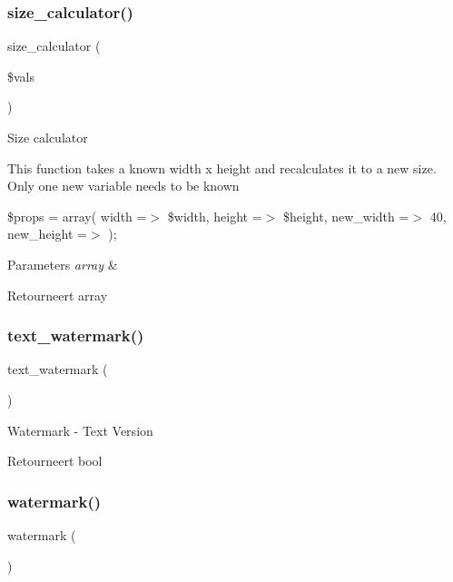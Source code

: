 \subsubsection{\texorpdfstring{size\_calculator()}{size\_calculator()}}
{\footnotesize\ttfamily size\+\_\+calculator (\begin{DoxyParamCaption}\item[{}]{\$vals }\end{DoxyParamCaption})}

Size calculator

This function takes a known width x height and recalculates it to a new size. Only one new variable needs to be known

\$props = array( \textquotesingle{}width\textquotesingle{} =$>$ \$width, \textquotesingle{}height\textquotesingle{} =$>$ \$height, \textquotesingle{}new\+\_\+width\textquotesingle{} =$>$ 40, \textquotesingle{}new\+\_\+height\textquotesingle{} =$>$ \textquotesingle{}\textquotesingle{} );


\begin{DoxyParams}{Parameters}
{\em array} & \\
\hline
\end{DoxyParams}
\begin{DoxyReturn}{Retourneert}
array 
\end{DoxyReturn}
\mbox{\label{class_c_i___image__lib_afb7640b6150e16b00efac0511d9fa03d}} 
\subsubsection{\texorpdfstring{text\_watermark()}{text\_watermark()}}
{\footnotesize\ttfamily text\+\_\+watermark (\begin{DoxyParamCaption}{ }\end{DoxyParamCaption})}

Watermark -\/ Text Version

\begin{DoxyReturn}{Retourneert}
bool 
\end{DoxyReturn}
\mbox{\label{class_c_i___image__lib_a4732a76680e7c0b28f98f6634b567cc9}} 
\subsubsection{\texorpdfstring{watermark()}{watermark()}}
{\footnotesize\ttfamily watermark (\begin{DoxyParamCaption}{ }\end{DoxyParamCaption})}

